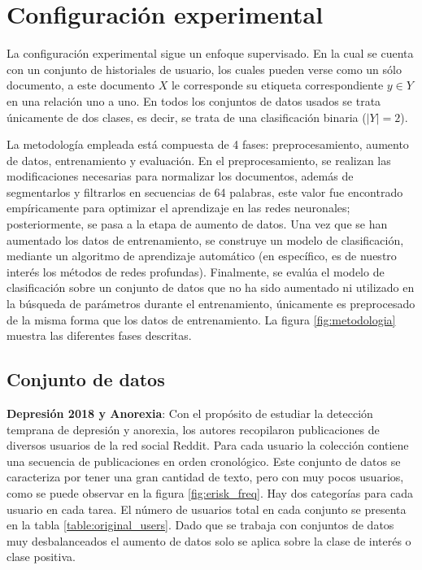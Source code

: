
\section{Configuración experimental}

La configuración experimental sigue un enfoque supervisado. En la cual se cuenta con un conjunto de historiales de usuario, los cuales pueden verse como un sólo documento, a este documento $X$ le corresponde su etiqueta correspondiente $y \in Y$  en una relación uno a uno. En todos los conjuntos de datos usados se trata únicamente de dos clases, es decir, se trata de una clasificación binaria ($|Y| = 2$). 

La metodología empleada está compuesta de 4 fases:  preprocesamiento, aumento de datos, entrenamiento y evaluación. En el preprocesamiento, se realizan las modificaciones necesarias para normalizar los documentos, además de segmentarlos y filtrarlos en secuencias de 64 palabras, este valor fue encontrado empíricamente para optimizar el aprendizaje en las redes neuronales; posteriormente, se pasa a la etapa de aumento de datos. Una vez que se han aumentado los datos de entrenamiento, se construye un modelo de clasificación, mediante un algoritmo de aprendizaje automático (en específico, es de nuestro interés los métodos de redes profundas). Finalmente, se evalúa el modelo de clasificación sobre un conjunto de datos que no ha sido aumentado ni utilizado en la búsqueda de parámetros durante el entrenamiento, únicamente es preprocesado de la misma forma que los datos de entrenamiento. La figura \ref{fig:metodologia} muestra las diferentes fases descritas. 



\subsection{Conjunto de datos}

\textbf{Depresión 2018 y Anorexia}: Con el propósito de estudiar la detección temprana de depresión y anorexia, los autores \citep{Losada2018} recopilaron publicaciones de diversos usuarios de la red social Reddit. Para cada usuario la colección contiene una secuencia de publicaciones en orden cronológico. Este conjunto de datos se caracteriza por tener una gran cantidad de texto, pero con muy pocos usuarios, como se puede observar en la figura \ref{fig:erisk_freq}. Hay dos categorías para cada usuario en cada tarea. El número de usuarios total en cada conjunto se presenta en la tabla \ref{table:original_users}. Dado que se trabaja con conjuntos de datos muy desbalanceados el aumento de datos solo se aplica sobre la clase de interés o clase positiva.


